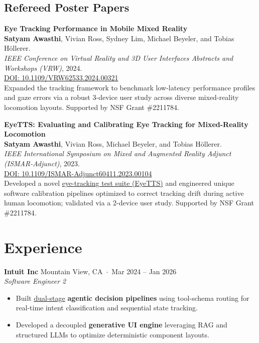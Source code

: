 \documentclass[10pt,letterpaper]{article}
\begin{document}
\medskip

\subsection*{Refereed Poster Papers}

\noindent \textbf{Eye Tracking Performance in Mobile Mixed Reality} \\
\textbf{Satyam Awasthi}, Vivian Ross, Sydney Lim, Michael Beyeler, and Tobias Höllerer. \\
\textit{IEEE Conference on Virtual Reality and 3D User Interfaces Abstracts and Workshops (VRW)}, 2024. \\
\href{https://doi.org/10.1109/VRW62533.2024.00321}{\color{accent}\footnotesize DOI: 10.1109/VRW62533.2024.00321} \\
Expanded the tracking framework to benchmark low-latency performance profiles and gaze errors via a robust 3-device user study across diverse mixed-reality locomotion layouts. Supported by NSF Grant \#2211784.

\smallskip
\smallskip

\noindent \textbf{EyeTTS: Evaluating and Calibrating Eye Tracking for Mixed-Reality Locomotion} \\
\textbf{Satyam Awasthi}, Vivian Ross, Michael Beyeler, and Tobias Höllerer. \\
\textit{IEEE International Symposium on Mixed and Augmented Reality Adjunct (ISMAR-Adjunct)}, 2023. \\
\href{https://doi.org/10.1109/ISMAR-Adjunct60411.2023.00104}{\color{accent}\footnotesize DOI: 10.1109/ISMAR-Adjunct60411.2023.00104} \\
Developed a novel \href{https://github.com/satyam-aw/Eye-Tracking-Test-Suite_EyeTTS_Data-Module}{eye-tracking test suite (EyeTTS)} and engineered unique software calibration pipelines optimized to correct tracking drift during active human locomotion; validated via a 2-device user study. Supported by NSF Grant \#2211784.

\newpage
\section*{Experience}

\noindent
\textbf{Intuit Inc} \hfill Mountain View, CA \,$\cdot$\, Mar 2024 – Jan 2026 \\
\textit{Software Engineer 2} 
\begin{itemize}
    \item Built \href{https://satyam-aw.github.io/projects/intuit_generative_ui/}{dual-stage} \textbf{agentic decision pipelines} using tool-schema routing for real-time intent classification and sequential state tracking.
    \item Developed a decoupled \textbf{generative UI engine} leveraging RAG and structured LLMs to optimize deterministic component layouts.
\end{itemize}
\end{document}
